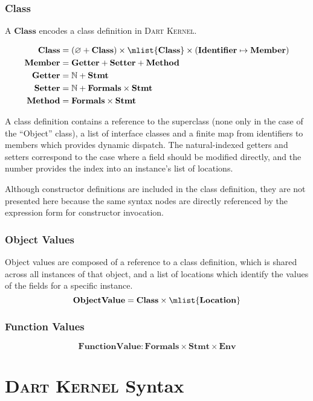 \documentclass[a4paper,oneside,fleqn]{article}
\newcommand{\kernel}{\textsc{Dart Kernel}}
\renewcommand{\emptyset}{\varnothing}
\newcommand{\NN}{\mathbb{N}}    %
\newcommand{\dstmt}{\mathbf{Stmt}}
\newcommand{\denv}{\mathbf{Env}}
\newcommand{\dfunval}{\mathbf{FunctionValue}}
\newcommand{\dobjval}{\mathbf{ObjectValue}}
\newcommand{\dmember}{\mathbf{Member}}
\newcommand{\dident}{\mathbf{Identifier}}
\newcommand{\dclass}{\mathbf{Class}}
\newcommand{\dformals}{\mathbf{Formals}}
\begin{document}
\subsubsection{Class}
\label{subsec:class}

A $\dclass$ encodes a class definition in \kernel{}.

\begin{align*}
\dclass &= (\emptyset + \dclass) \times \mlist{\dclass} \times (\dident \mapsto \dmember)\\
\dmember &= \mathbf{Getter} + \mathbf{Setter} + \mathbf{Method} \\
\mathbf{Getter} &= \NN + \dstmt \\
\mathbf{Setter} &= \NN + \dformals \times \dstmt \\
\mathbf{Method} &= \dformals \times \dstmt
\end{align*}

A class definition contains a reference to the superclass (none only in the case of the ``Object'' class), a list of interface classes and a finite map from identifiers to members which provides dynamic dispatch.
The natural-indexed getters and setters correspond to the case where a field should be modified directly, and the number provides the index into an instance's list of locations.

Although constructor definitions are included in the class definition, they are not presented here because the same syntax nodes are directly referenced by the expression form for constructor invocation.


\subsubsection{Object Values}
\label{subsec:object-values}

Object values are composed of a reference to a class definition, which is shared across all instances of that object, and a list of locations which identify the values of the fields for a specific instance.
\[
    \dobjval = \dclass \times \mlist{\dlocation}
\]

\subsubsection{Function Values}
\label{subsec:function-values}
\[
    \dfunval : \dformals \times \dstmt \times \denv
\]


\section{\kernel{} Syntax}
\label{sec:definitions}
\end{document}
